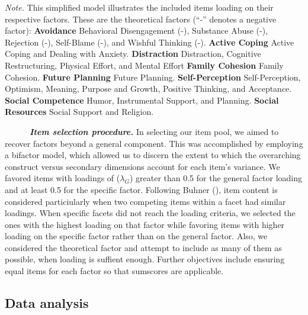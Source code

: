 \documentclass[
  man,floatsintext]{apa7}
\begin{document}
\vspace{-30pt}

\emph{Note.} This simplified model illustrates the included items loading on their respective factors. These are the theoretical factors (``-'' denotes a negative factor): \textbf{Avoidance} Behavioral Disengagement (-), Substance Abuse (-), Rejection (-), Self-Blame (-), and Wishful Thinking (-). \textbf{Active Coping} Active Coping and Dealing with Anxiety. \textbf{Distraction} Distraction, Cognitive Restructuring, Physical Effort, and Mental Effort \textbf{Family Cohesion} Family Cohesion. \textbf{Future Planning} Future Planning. \textbf{Self-Perception} Self-Perception, Optimism, Meaning, Purpose and Growth, Positive Thinking, and Acceptance. \textbf{Social Competence} Humor, Instrumental Support, and Planning. \textbf{Social Resources} Social Support and Religion. \normalsize \singlespacing \doublespacing

~~~~~~\textbf{\emph{Item selection procedure.}} In selecting our item pool, we aimed to recover factors beyond a general component. This was accomplished by employing a bifactor model, which allowed us to discern the extent to which the overarching construct versus secondary dimensions account for each item's variance. We favored items with loadings of (\(\lambda_{G}\)) greater than 0.5 for the general factor loading and at least 0.5 for the specific factor. Following Buhner (), item content is considered particiularly when two competing items within a facet had similar loadings. When specific facets did not reach the loading criteria, we selected the ones with the highest loading on that factor while favoring items with higher loading on the specific factor rather than on the general factor. Also, we considered the theoretical factor and attempt to include as many of them as possible, when loading is suffient enough. Further objectives include ensuring equal items for each factor so that sumscores are applicable.

\subsection{Data analysis}\label{data-analysis}
\end{document}
